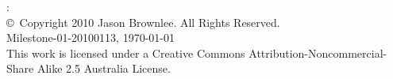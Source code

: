 



\begin{flushleft}
%
\mybooktitle: \mybooksubtitle \\
\copyright\ Copyright 2010 Jason Brownlee. All Rights Reserved. \\
\small{
Milestone-01-20100113, \today \\
This work is licensed under a Creative Commons Attribution-Noncommercial-Share Alike 2.5 Australia License.
}
%
\end{flushleft}

\hfill


	
\vfill\vfill\vfill